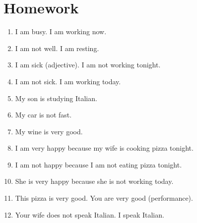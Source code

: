 \section{Homework} \label{0207-Homework}
\begin{enumerate}
    \item I am busy. I am working now. \\
    
    \item I am not well. I am resting. \\
    
    \item I am sick (adjective). I am not working tonight. \\
    
    \item I am not sick. I am working today. \\
    
    \item My son is studying Italian. \\
    
    \item My car is not fast. \\
    
    \item My wine is very good. \\
    
    \item I am very happy because my wife is cooking pizza tonight. \\
    
    \item I am not happy because I am not eating pizza tonight. \\
    
    \item She is very happy because she is not working today. \\
    
    \item This pizza is very good. You are very good (performance). \\
    
    \item Your wife does not speak Italian. I speak Italian. \\
\end{enumerate}
    
